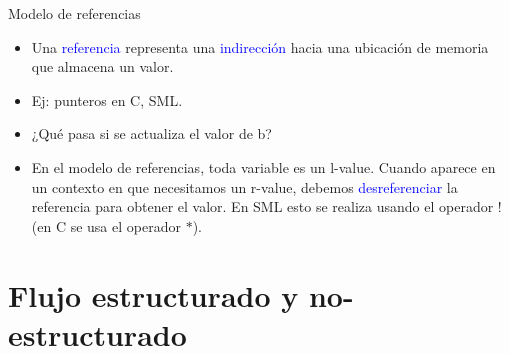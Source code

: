 \documentclass[handout]{beamer} %
\newcommand{\blue}[1]{\textcolor{blue}{#1}}
\begin{document}
\begin{frame}{Modelo de referencias}
\begin{minipage}{0.3\textwidth}
    \end{minipage}
    \begin{minipage}{0.65\textwidth}
     \begin{itemize}
         \item Una \blue{referencia} representa una \blue{indirección} hacia una ubicación de memoria que almacena un valor.
         \item Ej: punteros en C, SML.
         \item<2-> ¿Qué pasa si se actualiza el valor de b?
         \item<3-> En el modelo de referencias, toda variable es un l-value. Cuando aparece en un contexto en que necesitamos un r-value, debemos \blue{desreferenciar} la referencia para obtener el valor. En SML esto se realiza usando el operador ! (en C se usa el operador $*$).
     \end{itemize}
    \end{minipage}
\end{frame}
    
\section{Flujo estructurado y no-estructurado}
\end{document}
